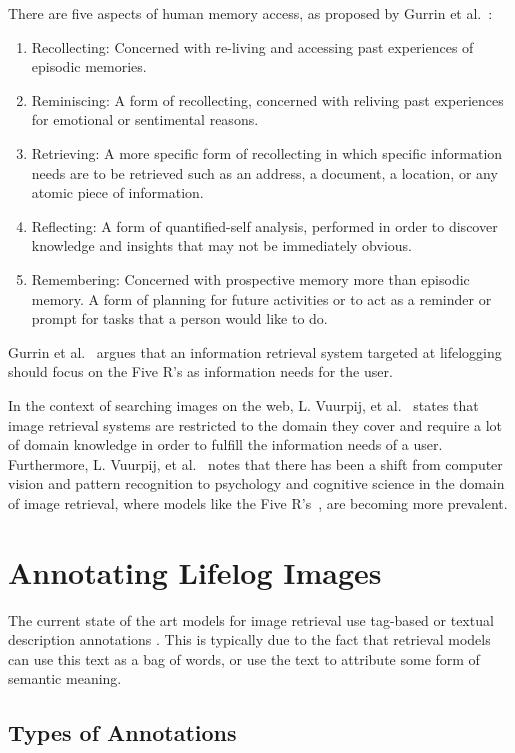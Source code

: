 \documentclass[12pt,a4paper]{article}
\begin{document}
There are five aspects of human memory access, as proposed by Gurrin et al.~\citep{gurrin2014lifelogging}:
\begin{enumerate}
    \item Recollecting: Concerned with re-living and accessing past experiences of episodic memories.
    \item Reminiscing: A form of recollecting, concerned with reliving past experiences for emotional or sentimental reasons.
    \item Retrieving: A more specific form of recollecting  in which specific information needs are to be retrieved such as an address, a document, a location, or any atomic piece of information.
    \item Reflecting: A form of quantified-self analysis, performed in order to discover knowledge and insights that may not be immediately obvious.
    \item Remembering: Concerned with prospective memory more than episodic memory. A form of planning for future activities or to act as a reminder or prompt for tasks that a person would like to do.
\end{enumerate}
Gurrin et al.~\cite{gurrin2014lifelogging} argues that an information retrieval system targeted at lifelogging should focus on the Five R's as information needs for the user.

In the context of searching images on the web,  L. Vuurpij, et al.~\cite{vuurpij2002vind} states that image retrieval systems are restricted to the domain they cover and require a lot of domain knowledge in order to fulfill the information needs of a user. Furthermore, L. Vuurpij, et al.~\cite{vuurpij2002vind} notes that there has been a shift from computer vision and pattern recognition to psychology and cognitive science in the domain of image retrieval, where models like the Five R's~\cite{gurrin2014lifelogging}, are becoming more prevalent. 

\section{Annotating Lifelog Images}
The current state of the art models for image retrieval use tag-based or textual description annotations \citep{ali2010semantically}. This is typically due to the fact that retrieval models can use this text as a bag of words, or use the text to attribute some form of semantic meaning.

\subsection{Types of Annotations}
\end{document}
